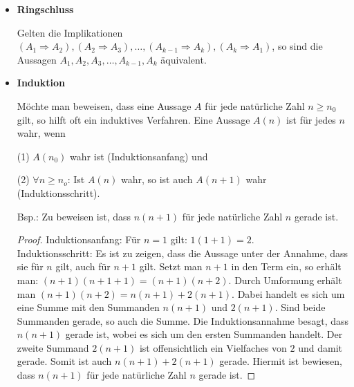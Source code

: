 \begin{itemize}
	\item \textbf{Ringschluss}
	
	Gelten die Implikationen $(A_{1} \Rightarrow A_{2}), (A_{2} \Rightarrow A_{3}),\dotsc , (A_{k-1} \Rightarrow A_{k}), (A_{k} \Rightarrow A_{1})$, so sind die Aussagen $A_{1}, A_{2}, A_{3},\dotsc , A_{k-1}, A_{k}$ {\"a}quivalent.
	\item \textbf{Induktion}
	
	Möchte man beweisen, dass eine Aussage $A$ für jede nat{\"u}rliche Zahl $n\geq n_{0}$ gilt, so hilft oft ein induktives Verfahren.
	Eine Aussage $A(n)$ ist für jedes $n$ wahr, wenn
	
	(1) $A(n_{0})$ wahr ist (Induktionsanfang) und
	
	(2) $\forall n \geq n_{o}$: Ist $A(n)$ wahr, so ist auch $A(n+1)$ wahr (Induktionsschritt).
	
	Bsp.: Zu beweisen ist, dass $n(n+1)$ für jede natürliche Zahl $n$ gerade ist.
	\begin{proof}
	Induktionsanfang: 
	Für $n=1$ gilt: $1(1+1)=2$.\\
	Induktionsschritt: Es ist zu zeigen, dass die Aussage unter der Annahme, dass sie für $n$ gilt, auch für $n+1$ gilt.
	Setzt man $n+1$ in den Term ein, so erh{\"a}lt man:
	$(n+1)(n+1+1)=(n+1)(n+2)$.
	Durch Umformung erh{\"a}lt man $(n+1)(n+2)=n(n+1)+2(n+1)$. Dabei handelt es sich um eine Summe mit den Summanden $n(n+1)$ und $2(n+1)$. Sind beide Summanden gerade, so auch die Summe. Die Induktionsannahme besagt, dass $n(n+1)$ gerade ist, wobei es sich um den ersten Summanden handelt. Der zweite Summand $2(n+1)$ ist offensichtlich ein Vielfaches von $2$ und damit gerade. Somit ist auch $n(n+1)+2(n+1)$ gerade. Hiermit ist bewiesen, dass $n(n+1)$ für jede nat{\"u}rliche Zahl $n$ gerade ist.
	\end{proof}
	
\end{itemize}

%
